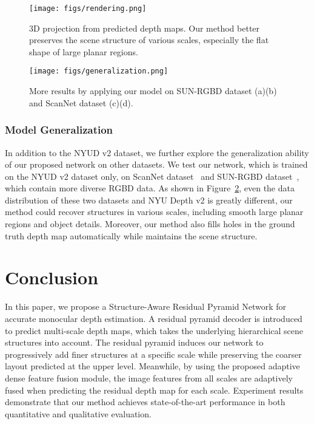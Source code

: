 \documentclass{article}
\begin{document}
\begin{figure} 
	\centering 
	\texttt{[image: figs/rendering.png]}
	\caption{3D projection from predicted depth maps. Our method better preserves the scene structure of various scales, especially the flat shape of large planar regions.}
	\label{fig:Rendering}
\end{figure}

\begin{figure} 
	\centering 
	\texttt{[image: figs/generalization.png]}
	\caption{More results by applying our model on SUN-RGBD dataset (a)(b) and ScanNet dataset (c)(d).}
	\label{fig:newdataset}
\end{figure}

\subsubsection{Model Generalization} 
In addition to the NYUD v2 dataset, we further explore the generalization ability of our proposed network on other datasets.
We test our network, which is trained on the NYUD v2 dataset only, on ScanNet dataset~\cite{dai2017scannet} and SUN-RGBD dataset~\cite{song2015sun}, which contain more diverse RGBD data.  
As shown in Figure~\ref{fig:newdataset}, even the data distribution of these two datasets and NYU Depth v2 is greatly different, our method could recover structures in various scales, including smooth large planar regions and object details. 
Moreover, our method also fills holes in the ground truth depth map automatically while maintains the scene structure. 	
	
	\section{Conclusion}
	
	In this paper, we propose a Structure-Aware Residual Pyramid Network for accurate monocular depth estimation. 
	A residual pyramid decoder is introduced to predict multi-scale depth maps, which takes the underlying hierarchical scene structures into account.
	The residual pyramid induces our network to progressively add finer structures at a specific scale while preserving the coarser layout predicted at the upper level. 
	Meanwhile, by using the proposed adaptive dense feature fusion module, the image features from all scales are adaptively fused when predicting the residual depth map for each scale. Experiment results demonstrate that our method achieves state-of-the-art performance in both quantitative and qualitative evaluation. 
\end{document}
